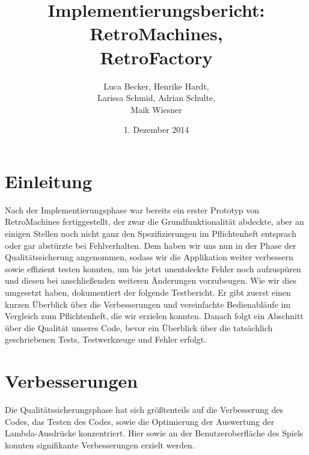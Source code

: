 \documentclass[parskip=full]{scrreprt}
\begin{document}
\title{Implementierungsbericht: RetroMachines, \\ RetroFactory}
\author{Luca Becker, Henrike Hardt,\\Larissa Schmid, Adrian Schulte,\\Maik Wiesner}
\date{1. Dezember 2014}
\maketitle
\thispagestyle{empty}

\clearpage

\thispagestyle{empty}
\tableofcontents
\thispagestyle{empty}

\clearpage
\setcounter{page}{1}

\chapter{Einleitung}

Nach der Implementierungsphase war bereits ein erster Prototyp von RetroMachines fertiggestellt, der zwar die Grundfunktionalität abdeckte, aber an einigen Stellen noch nicht ganz den Spezifizierungen im Pflichtenheft entsprach oder gar abstürzte bei Fehlverhalten.
Dem haben wir uns nun in der Phase der Qualitätssicherung angenommen, sodass wir die Applikation weiter verbessern sowie effizient testen konnten, um bis jetzt unentdeckte Fehler noch aufzuspüren und diesen bei anschließenden weiteren Änderungen vorzubeugen.
Wie wir dies umgesetzt haben, dokumentiert der folgende Testbericht. Er gibt zuerst einen kurzen Überblick über die Verbesserungen und vereinfachte Bedienabläufe im Vergleich zum Pflichtenheft, die wir erzielen konnten. Danach folgt ein Abschnitt über die Qualität unseres Code, bevor ein Überblick über die tatsächlich geschriebenen Tests, Testwerkzeuge und Fehler erfolgt.

\chapter{Verbesserungen}

Die Qualitätssicherungsphase hat sich größtenteils auf die Verbesserung des Codes, das Testen des Codes, sowie die Optimierung der Auswertung der Lambda-Ausdrücke konzentriert. Hier sowie an der Benutzeroberfläche des Spiels konnten signifikante Verbesserungen erzielt werden. 
\end{document}
